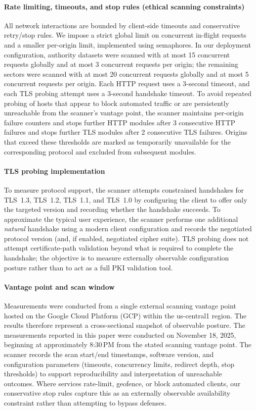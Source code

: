 \documentclass[a4paper,fleqn]{cas-sc}
\begin{document}
    \paragraph{Rate limiting, timeouts, and stop rules (ethical scanning constraints)}
    All network interactions are bounded by client-side timeouts and conservative retry/stop rules. We impose a strict global limit on concurrent in-flight requests and a smaller per-origin limit, implemented using semaphores. In our deployment configuration, authority datasets were scanned with at most 15 concurrent requests globally and at most 3 concurrent requests per origin; the remaining sectors were scanned with at most 20 concurrent requests globally and at most 5 concurrent requests per origin. 
    Each HTTP request uses a 3-second timeout, and each TLS probing attempt uses a 3-second handshake timeout. 
    To avoid repeated probing of hosts that appear to block automated traffic or are persistently unreachable from the scanner's vantage point, the scanner maintains per-origin failure counters and stops further HTTP modules after 3 consecutive HTTP failures and stops further TLS modules after 2 consecutive TLS failures. 
    Origins that exceed these thresholds are marked as temporarily unavailable for the corresponding protocol and excluded from subsequent modules.

    \paragraph{TLS probing implementation}
    To measure protocol support, the scanner attempts constrained handshakes for TLS~1.3, TLS~1.2, TLS~1.1, and TLS~1.0 by configuring the client to offer only the targeted version and recording whether the handshake succeeds. To approximate the typical user experience, the scanner performs one additional \emph{natural} handshake using a modern client configuration and records the negotiated protocol version (and, if enabled, negotiated cipher suite). TLS probing does not attempt certificate-path validation beyond what is required to complete the handshake; the objective is to measure externally observable configuration posture rather than to act as a full PKI validation tool.

    \paragraph{Vantage point and scan window}
    Measurements were conducted from a single external scanning vantage point hosted on the Google Cloud Platform (GCP) within the us-central1 region.
    The results therefore represent a cross-sectional snapshot of observable posture. The measurements reported in this paper were conducted on November 18, 2025, beginning at approximately 8:30\,PM from the stated scanning vantage point.
    The scanner records the scan start/end timestamps, software version, and configuration parameters (timeouts, concurrency limits, redirect depth, stop thresholds) to support reproducibility and interpretation of unreachable outcomes. 
    Where services rate-limit, geofence, or block automated clients, our conservative stop rules capture this as an externally observable availability constraint rather than attempting to bypass defenses.
\end{document}
